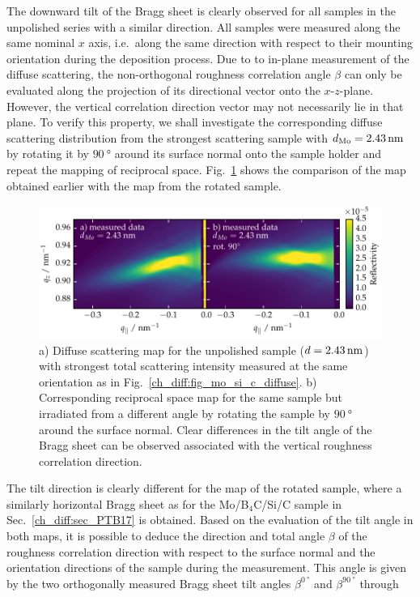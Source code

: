 The downward tilt of the Bragg sheet is clearly observed for all samples in the unpolished series with a similar direction. All samples were measured along the same nominal $x$ axis, i.e.~along the same direction with respect to their mounting orientation during the deposition process. Due to to in-plane measurement of the diffuse scattering, the non-orthogonal roughness correlation angle $\beta$ can only be evaluated along the projection of its directional vector onto the $x$-$z$-plane. However, the vertical correlation direction vector may not necessarily lie in that plane. To verify this property, we shall investigate the corresponding diffuse scattering distribution from the strongest scattering sample with $d_\text{Mo} = \nm{2.43}$ by rotating it by $\SI{90}{\degree}$ around its surface normal onto the sample holder and repeat the mapping of reciprocal space. Fig.~\ref{ch_diff:fig_diffuse_tilt_vs_notilt} shows the comparison of the map obtained earlier with the map from the rotated sample.
\begin{figure}[htbp]
\centering
\includegraphics[width=\textwidth]{img/MoSiC_diffuse_tilt_vs_notilt}
\caption[Diffuse scattering maps of the Mo/B$_4$C/Si/C sample for two rotational orientations.]{a) Diffuse scattering map for the unpolished sample ($d=\nm{2.43}$) with strongest total scattering intensity measured at the same orientation as in Fig.~\ref{ch_diff:fig_mo_si_c_diffuse}. b) Corresponding reciprocal space map for the same sample but irradiated from a different angle by rotating the sample by $\SI{90}{\degree}$ around the surface normal. Clear differences in the tilt angle of the Bragg sheet can be observed associated with the vertical roughness correlation direction.}
\label{ch_diff:fig_diffuse_tilt_vs_notilt}
\end{figure}
The tilt direction is clearly different for the map of the rotated sample, where a similarly horizontal Bragg sheet as for the Mo/B$_4$C/Si/C sample in Sec.~\ref{ch_diff:sec_PTB17} is obtained. Based on the evaluation of the tilt angle in both maps, it is possible to deduce the direction and total angle $\beta$ of the roughness correlation direction with respect to the surface normal and the orientation directions of the sample during the measurement. This angle is given by the two orthogonally measured Bragg sheet tilt angles $\beta^{\SI{0}{\degree}}$ and $\beta^{\SI{90}{\degree}}$ through
